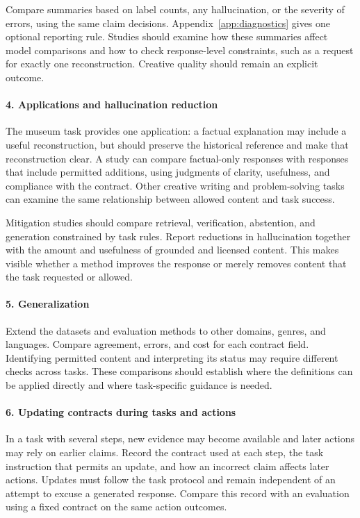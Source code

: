 \documentclass{clv2025}
\begin{document}
Compare summaries based on label counts, any hallucination, or the severity
of errors, using the same claim decisions. Appendix~\ref{app:diagnostics}
gives one optional reporting rule. Studies should examine how these summaries
affect model comparisons and how to check response-level constraints, such
as a request for exactly one reconstruction. Creative quality should
remain an explicit outcome.

\paragraph{4. Applications and hallucination reduction}
The museum task provides one application: a factual explanation may include
a useful reconstruction, but should preserve the historical reference and
make that reconstruction clear. A study can compare factual-only responses
with responses that include permitted additions, using judgments of clarity,
usefulness, and compliance with the contract. Other creative writing and
problem-solving tasks can examine the same relationship between allowed
content and task success.

Mitigation studies should compare retrieval, verification, abstention, and
generation constrained by task rules. Report reductions in hallucination
together with the amount and usefulness of grounded and licensed content.
This makes visible whether a method improves the response or merely removes
content that the task requested or allowed.

\paragraph{5. Generalization}
Extend the datasets and evaluation methods to other domains, genres, and
languages. Compare agreement, errors, and cost for each contract field.
Identifying permitted content and interpreting its status may require
different checks across tasks. These comparisons should establish where
the definitions can be applied directly and where task-specific guidance
is needed.

\paragraph{6. Updating contracts during tasks and actions}
In a task with several steps, new evidence may become available and later
actions may rely on earlier claims. Record the contract used at each step,
the task instruction that permits an update, and how an incorrect claim
affects later actions. Updates must follow the task protocol and remain
independent of an attempt to excuse a generated response. Compare this
record with an evaluation using a fixed contract on the same action outcomes.
\end{document}
